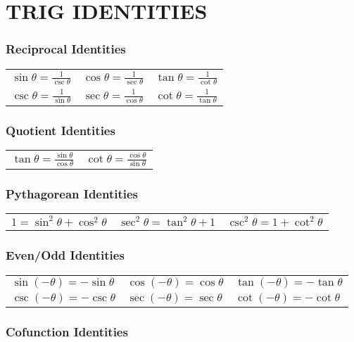 \section{TRIG \;IDENTITIES}
\subsubsection{Reciprocal Identities}

\begin{tabular}{m{5.5cm} m{5.5cm} m}
   $\sin \theta=\frac{1}{\csc \theta}$ & $\cos \theta=\frac{1}{\sec \theta}$ & $\tan \theta=\frac{1}{\cot \theta}$ \\
   $\csc \theta=\frac{1}{\sin \theta}$ & $\sec \theta=\frac{1}{\cos \theta}$ & $\cot \theta=\frac{1}{\tan \theta}$
\end{tabular}

\subsubsection{Quotient Identities}

\begin{tabular}{m{7cm} m}
    $\tan \theta=\frac{\sin \theta}{\cos \theta}$ & $\cot \theta=\frac{\cos \theta}{\sin \theta}$
\end{tabular}

\subsubsection{Pythagorean Identities}
\begin{tabular}{m{5.5cm} m{5.5cm} m}
    $1=\sin ^2 \theta+\cos ^2 \theta$ & $\sec ^2 \theta=\tan ^2 \theta+1$ & $\csc ^2 \theta=1+\cot ^2 \theta$ \\
\end{tabular}

\subsubsection{Even/Odd Identities}

\begin{tabular}{m{5cm} m{5cm} m}
    $\sin (-\theta)=-\sin \theta$ & $\cos (-\theta)=\cos \theta$ & $\tan (-\theta)=-\tan \theta$\\
    $\csc (-\theta)=-\csc \theta$ & $\sec (-\theta)=\sec \theta$ & $\cot (-\theta)=-\cot \theta$
\end{tabular}

\subsubsection{Cofunction Identities}

